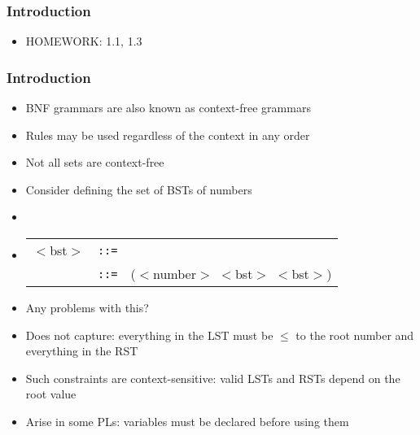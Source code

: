 \documentclass{beamer}
\newcommand{\elist}{\texttt{\textquotesingle{()}}}
\newcommand{\is}{\texttt{::=}}
\begin{document}
\begin{frame}[fragile]
\frametitle{Introduction}
\begin{scriptsize}
\begin{itemize}
\item<1-> HOMEWORK: 1.1, 1.3

\end{itemize}
\end{scriptsize}
\end{frame}

\begin{frame}[fragile]
\frametitle{Introduction}
\begin{scriptsize}
\begin{itemize}
\item<1-> BNF grammars are also known as context-free grammars

\item<1-> Rules may be used regardless of the context in any order

\item<2-> Not all sets are context-free

\item<2-> Consider defining the set of BSTs of numbers

\item<2->

\item<3->
  \begin{tabular}{lll}
    $<$bst$>$ & \is{} & \elist{} \\
     & \is{} & ($<$number$>$ $<$bst$>$ $<$bst$>$) \\
  \end{tabular}

\item<3-> Any problems with this?

\item<4-> Does not capture: everything in the LST must be $\leq$ to the root number and everything in the RST

\item<4-> Such constraints are context-sensitive: valid LSTs and RSTs depend on the root value

\item<5-> Arise in some PLs: variables must be declared before using them

\end{itemize}
\end{scriptsize}
\end{frame}
\end{document}
